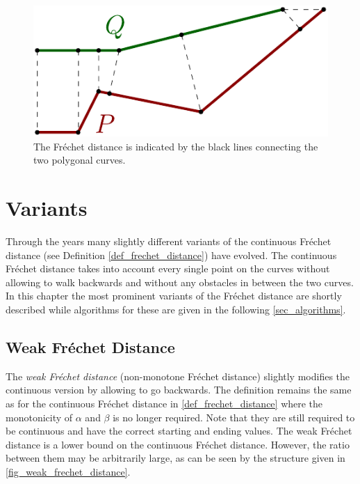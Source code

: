 \documentclass[
oneside,
fontsize=11pt
]{scrartcl}
\begin{document}
\begin{figure}[ht]
  \centering
  \includegraphics{images/frechet_distance/frechet-distance-example.pdf}
  \caption{The Fréchet distance is indicated by the black lines connecting the two polygonal curves.}
  \label{fig_frechet_distance_example}
\end{figure}






\section{Variants}
Through the years many slightly different variants of the continuous Fréchet distance (see Definition \ref{def_frechet_distance}) have evolved. 
The continuous Fréchet distance takes into account every single point on the curves 
without allowing to walk backwards 
and without any obstacles in between the two curves.
In this chapter the most prominent variants of the Fréchet distance are shortly described 
while algorithms for these are given in the following \autoref{sec_algorithms}.

\subsection{Weak Fréchet Distance}
\label{sec_weak_frechet_distance}
The \textit{weak Fréchet distance} (non-monotone Fréchet distance) 
slightly modifies the continuous version by allowing to go backwards. 
The definition remains the same as for the continuous Fréchet distance in \autoref{def_frechet_distance}
where the monotonicity of $\alpha$ and $\beta$ is no longer required.
Note that they are still required to be continuous and have the correct starting and ending values.
The weak Fréchet distance is a lower bound on the continuous Fréchet distance.
However, the ratio between them may be arbitrarily large, 
as can be seen by the structure given in \autoref{fig_weak_frechet_distance}. \cite{alt_computing_1995}
\end{document}
